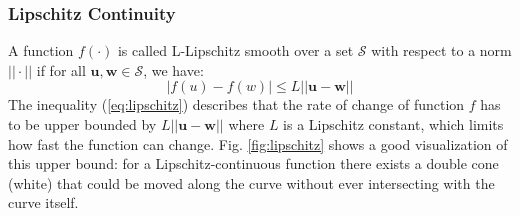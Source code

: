 \documentclass[11pt]{article}
\begin{document}
\subsubsection{Lipschitz Continuity}
A function $f(\cdot)$ is called L-Lipschitz smooth over a set $\mathcal{S}$ with respect to a norm $|| \cdot ||$ if for all $\bm{u}, \bm{w} \in \mathcal{S}$, we have:
\begin{equation}
    \label{eq:lipschitz}
    |f(u) - f(w)| \leq L || \bm{u} - \bm{w} ||
\end{equation}
The inequality (\ref{eq:lipschitz}) describes that the rate of change of function $f$ has to be upper bounded by $L || \bm{u} - \bm{w} ||$ where $L$ is a Lipschitz constant, which limits how fast the function can change. Fig. \ref{fig:lipschitz} shows a good visualization \cite{wiki:lipschitz} of this upper bound: for a Lipschitz-continuous function there exists a double cone (white) that could be moved along the curve without ever intersecting with the curve itself.
\end{document}
